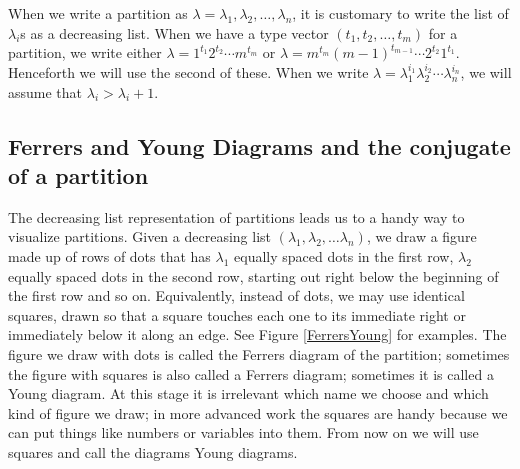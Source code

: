 {When we write a partition as
$\lambda =
\lambda_1,\lambda_2,\ldots,\lambda_n$, it is customary to write the list of
$\lambda_i$s as a decreasing list.  When we have a type vector
$(t_1,t_2,\ldots,t_m)$ for a partition, we write either $\lambda =
1^{t_1}2^{t_2}\cdots m^{t_m}$ or $\lambda =  m^{t_m}(m-1)^{t_{m-1}}\cdots
2^{t_2}1^{t_1}$.  Henceforth we will use the second of these.  When we
write $\lambda=\lambda_1^{i_1}\lambda_2^{i_2}\cdots\lambda_n^{i_n}$, we
will assume that $\lambda_i>\lambda_i+1$.



\subsection{Ferrers and Young Diagrams and the conjugate of a partition}
The decreasing list representation of partitions leads us to a handy way
to visualize partitions.  Given a decreasing list
$(\lambda_1,\lambda_2,\ldots \lambda_n)$, we draw a figure made up of
rows of dots that has $\lambda_1$ equally spaced dots in the first row,
$\lambda_2$ equally spaced dots in the second row, starting out right
below the beginning of the first row and so on.  Equivalently, instead of
dots, we may use identical squares, drawn so that a square touches each
one to its immediate right or immediately below it along an edge.  See
Figure
\ref{FerrersYoung} for examples. The figure we draw
with dots is called the Ferrers diagram of the partition; sometimes the
figure with squares is also called a Ferrers diagram; sometimes it is
called a Young diagram.  At this stage it is irrelevant which name we
choose and which kind of figure we draw; in more advanced work the squares
are handy because we can put things like numbers or variables into them. 
From now on we will use squares and call the diagrams Young diagrams.

}

